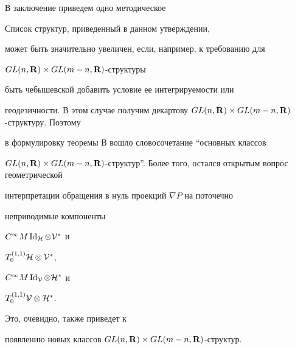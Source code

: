  


В заключение приведем одно методическое 


 


\begin{notenonum} Список структур, приведенный в данном утверждении,


может быть значительно увеличен, если, например, к требованию для 


$GL(n,\bold R)\times GL(m-n,\bold R)$-структуры 


быть чебышевской добавить условие ее интегрируемости или 


геодезичности. В этом случае получим декартову $GL(n,\bold R)\times GL(m-n,\bold R)$-структуру. Поэтому 


в формулировку теоремы В вошло словосочетание ``основных классов 


$GL(n,\bold R)\times GL(m-n,\bold R)$-структур''. Более того, остался открытым вопрос геометрической 


интерпретации обращения в нуль проекций $\nabla P$ на поточечно 


неприводимые компоненты 


$C^\infty M\operatorname{Id}_{\cal H}\otimes\cal V^*$ и 


$T^{(1,1)}_0\cal H\otimes\cal V^*$, 


$C^\infty M\operatorname{Id}_{\cal V}\otimes\cal H^*$ и 


$T^{(1,1)}_0\cal V\otimes\cal H^*$. 


Это, очевидно, также приведет к 


появлению новых классов $GL(n,\bold R)\times GL(m-n,\bold R)$-структур. 


\end{notenonum} 


 


